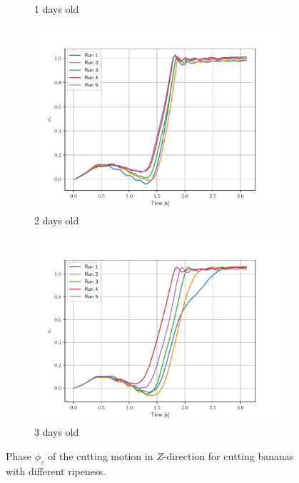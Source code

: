 \documentclass[aspectratio=169]{beamer}
\newenvironment{figure*}%
{\begin{figure}}
	{\end{figure}}
\begin{document}
\begin{frame}
\begin{figure}[t]
\begin{subfigure}[t]{0.32\linewidth}
\vspace{-0.32cm}
\caption{\scriptsize 1 days old}
		\label{EX:ph_banana_1}
	\end{subfigure}
	\begin{subfigure}[t]{0.32\linewidth}
		\centering
		\includegraphics[width=\textwidth]{images/ph_banana_2.pdf}
\vspace{-0.32cm}
\caption{\scriptsize 2 days old}
		\label{EX:ph_banana_2}
	\end{subfigure}
	\begin{subfigure}[t]{0.32\linewidth}
		\centering
		\includegraphics[width=\textwidth]{images/ph_banana_3.pdf}
\vspace{-0.32cm}
\caption{\scriptsize 3 days old}
		\label{EX:ph_banana_3}
	\end{subfigure}
	\vspace{-0.5cm}
	\caption{Phase $\phi_z$ of the cutting motion in $Z$-direction for cutting bananas with different ripeness.}
	\label{EX:ph_banana}
\end{figure}
\end{frame}
\end{document}
